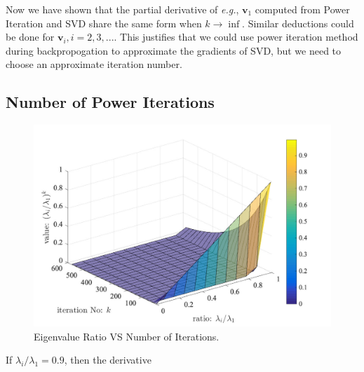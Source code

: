 \documentclass{article}
\newcommand{\bv}{\mathbf{v}}
\begin{document}
Now we have shown that the partial derivative of \emph{e.g.}, $\bv_1$ computed from Power Iteration and SVD share the same form when $k\rightarrow \inf$.
Similar deductions could be done for  $\bv_i, i=2,3,...$.
This justifies that we could use power iteration method during backpropogation to approximate the gradients of SVD, but we need to choose an approximate iteration number.

\subsection{Number of Power Iterations}

\begin{figure}[!htb]
\begin{center}
\includegraphics[width=0.7\linewidth]{curve.pdf}
\end{center}
\caption{Eigenvalue Ratio VS Number of Iterations.}
\label{fig: curve}
\end{figure}

If $\lambda_i / \lambda_1 {=} 0.9$, then the derivative 
\medskip
\small


\end{document}

